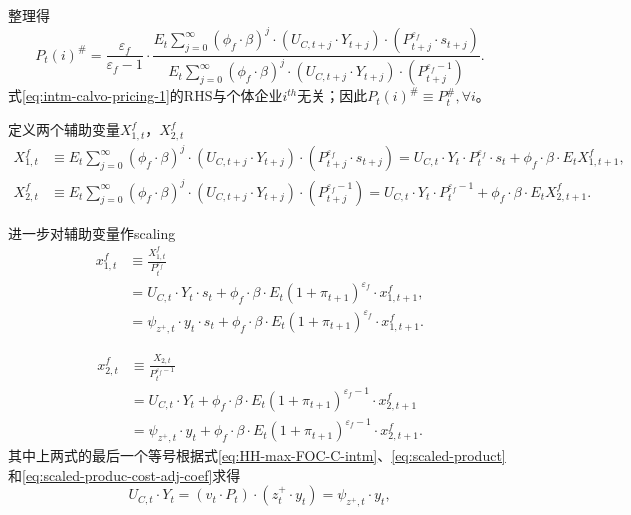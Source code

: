 整理得
\begin{equation}
  \label{eq:intm-calvo-pricing-1}
  P_{t}(i)^{\#} = \frac{\varepsilon_f}{\varepsilon_f -1} \cdot \frac
{
  E_t \sum_{j=0}^{\infty}\left( \phi_f \cdot \beta \right)^j \cdot
\left(
U_{C,t+j} \cdot Y_{t+j}
\right) \cdot
\left(
P_{t+j}^{\varepsilon_f} \cdot s_{t+j}
\right)
}
{
  E_t \sum_{j=0}^{\infty}\left( \phi_f \cdot \beta \right)^j \cdot
\left(
U_{C,t+j} \cdot Y_{t+j}
\right) \cdot
\left(
P_{t+j}^{\varepsilon_f - 1}
\right)
}.
\end{equation}
式\eqref{eq:intm-calvo-pricing-1}的RHS与个体企业$i^{th}$无关；因此$P_t(i)^{\#} \equiv P_t^{\#}, \forall i$。

定义两个辅助变量$X_{1,t}^f$，$X_{2,t}^f$
\begin{align}
\label{eq:intm-prod-auxiliary-X-1}
  X_{1,t}^f &\equiv   E_t \sum_{j=0}^{\infty}\left( \phi_f \cdot \beta \right)^j \cdot
\left(
U_{C,t+j} \cdot Y_{t+j}
\right) \cdot
\left(
P_{t+j}^{\varepsilon_f} \cdot s_{t+j}
\right)
=U_{C,t} \cdot Y_{t} \cdot P_{t}^{\varepsilon_f} \cdot s_t + \phi_f \cdot \beta \cdot E_t X_{1,t+1}^f,\\
\label{eq:intm-prod-auxiliary-X-2}
  X_{2,t}^f &\equiv   E_t \sum_{j=0}^{\infty}\left( \phi_f \cdot \beta \right)^j \cdot
\left(
U_{C,t+j} \cdot Y_{t+j}
\right) \cdot
\left(
P_{t+j}^{\varepsilon_f-1}
\right)=U_{C,t} \cdot Y_{t} \cdot P_{t}^{\varepsilon_f-1} + \phi_f \cdot \beta \cdot E_t X_{2,t+1}^f.
\end{align}


进一步对辅助变量作scaling
\begin{equation}
\label{eq:intm-prod-auxiliary-x-1}
\begin{split}
  x_{1,t}^f &\equiv   \frac{X_{1,t}^f}{P_t^{\varepsilon_f}} \\
&=U_{C,t} \cdot Y_{t} \cdot s_t + \phi_f \cdot \beta \cdot E_t (1+\pi_{t+1})^{\varepsilon_f} \cdot x_{1,t+1}^f,\\
&= \psi_{z^+,t} \cdot y_t \cdot s_t + \phi_f \cdot \beta \cdot E_t (1+\pi_{t+1})^{\varepsilon_f} \cdot x_{1,t+1}^f.
\end{split}
\end{equation}

\begin{equation}
\label{eq:intm-prod-auxiliary-x-2}
\begin{split}
  x_{2,t}^f &\equiv   \frac{X_{2,t}}{P_t^{\varepsilon_f -1}} \\
  &=U_{C,t} \cdot Y_{t} + \phi_f \cdot \beta \cdot E_t (1+\pi_{t+1})^{\varepsilon_f -1} \cdot x_{2,t+1}^f \\
  &=\psi_{z^+,t} \cdot y_t  + \phi_f \cdot \beta \cdot E_t (1+\pi_{t+1})^{\varepsilon_f -1} \cdot x_{2,t+1}^f.
\end{split}
\end{equation}
其中上两式的最后一个等号根据式\eqref{eq:HH-max-FOC-C-intm}、\eqref{eq:scaled-product}和\eqref{eq:scaled-produc-cost-adj-coef}求得
\begin{equation}
\label{eq:U-C-t-Y-t}
U_{C,t} \cdot Y_t = \left(v_t \cdot P_t \right) \cdot \left(z^+_t \cdot y_t \right) = \psi_{z^+,t} \cdot y_t,
\end{equation}

